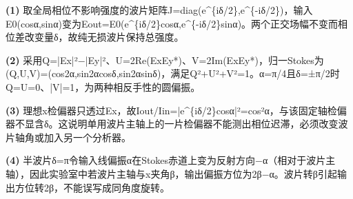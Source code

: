 \par\noindent\textbf{(1)} 取全局相位不影响强度的波片矩阵J=diag(e\textasciicircum{}\{iδ/2\},e\textasciicircum{}\{-iδ/2\})，输入E0(cosα,sinα)变为Eout=E0(e\textasciicircum{}\{iδ/2\}cosα,e\textasciicircum{}\{-iδ/2\}sinα)。两个正交场幅不变而相位差改变量δ，故纯无损波片保持总强度。
\par\noindent\textbf{(2)} 采用Q=|Ex|²−|Ey|²、U=2Re(ExEy*)、V=2Im(ExEy*)，归一Stokes为(Q,U,V)=(cos2α,sin2αcosδ,sin2αsinδ)，满足Q²+U²+V²=1。α=π/4且δ=±π/2时Q=U=0、|V|=1，为两种相反手性的圆偏振。
\par\noindent\textbf{(3)} 理想x检偏器只透过Ex，故Iout/Iin=|e\textasciicircum{}\{iδ/2\}cosα|²=cos²α，与该固定轴检偏器不显含δ。这说明单用波片主轴上的一片检偏器不能测出相位迟滞，必须改变波片轴角或加入另一个分析器。
\par\noindent\textbf{(4)} 半波片δ=π令输入线偏振α在Stokes赤道上变为反射方向−α（相对于波片主轴），因此实验室中若波片主轴与x夹角β，输出偏振方位为2β−α。波片转β引起输出方位转2β，不能误写成同角度旋转。
